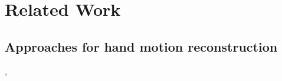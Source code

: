 
\lhead[\chaptername~\thechapter]{\rightmark}

\rhead[\leftmark]{}

\lfoot[\thepage]{}

\cfoot{}

\rfoot[]{\thepage}


\chapter{Related Work}
\label{cha:relatedWork}


\section{Approaches for hand motion reconstruction} \label{sec:approaches}

\cite{sturman1994survey}, \cite{dipietro2008survey}

